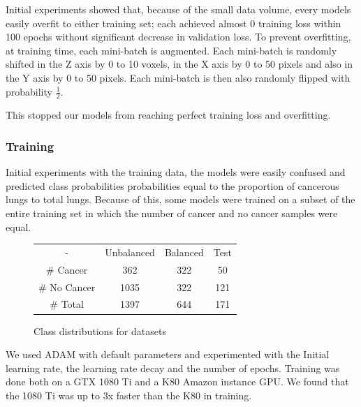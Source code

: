 \documentclass[twocolumn,10pt]{article}
\begin{document}
Initial experiments showed that, because of the small data volume, every models 
easily overfit to either training set; each achieved almost 0 training loss within
100 epochs without significant decrease in validation loss.
 To prevent overfitting, at training time, each mini-batch is augmented. Each
mini-batch is randomly shifted in the Z axis by 0 to 10 voxels, in the X axis by 
0 to 50 pixels and also in the Y axis by 0 to 50 pixels. Each mini-batch is then
also randomly flipped with probability \(\frac 1 2\).

This stopped our models from reaching perfect training loss and overfitting.

\subsubsection{Training}

Initial experiments with the training data, the models were easily confused and 
predicted class probabilities probabilities equal to the proportion of cancerous
lungs to total lungs. Because of this, some models were trained on a subset of 
the entire training set in which the number of cancer and no cancer samples
were equal.
\begin{figure}[H]
  \label{fig:data_distributions}
  \begin{center}
    \begin{tabular}{ | c || c |c| c| }
    \hline
     - & Unbalanced & Balanced & Test\\
    \hhline{|=||=|=|=|}
    \# Cancer & 362 & 322 & 50 \\
    \hline
    \# No Cancer & 1035 & 322 & 121\\
    \hline
    \# Total & 1397 & 644 & 171\\
    \hline
    \end{tabular}  
\end{center}
    \caption{Class distributions for datasets}
\end{figure}

We used ADAM with default parameters and experimented with the Initial learning rate, the learning rate decay and the number of epochs. Training was done both on a GTX 1080 Ti and a K80 Amazon instance GPU. We found that the 1080 Ti was up to 3x faster than the K80 in training.
\end{document}
